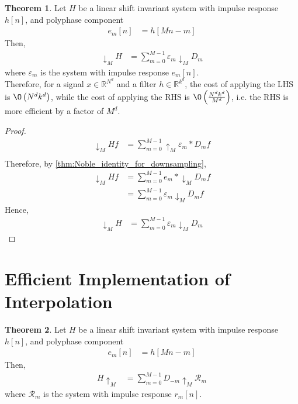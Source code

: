 \documentclass[titlepage, fleqn, a4paper, 12pt, twoside]{article}
\theoremstyle{definition}
\theoremstyle{theorem}
\newtheorem{theorem}{Theorem}
\def\downsample#1{\downarrow_{#1}}
\def\upsample#1{\uparrow_{#1}}
\begin{document}
\begin{theorem}
	Let $H$ be a linear shift invariant system with impulse response $h[n]$, and polyphase component
	\begin{align*}
		e_m[n] &= h[M n - m]
	\end{align*}
	Then,
	\begin{align*}
		\downsample{M} H &= \sum\limits_{m = 0}^{M - 1} \varepsilon_m \downsample{M} D_m
	\end{align*}
	where $\varepsilon_m$ is the system with impulse response $e_m[n]$.\\
	Therefore, for a signal $x \in \mathbb{R}^{N^d}$ and a filter $h \in \mathbb{R}^{k^d}$, the cost of applying the LHS is $\O\left( N^d k^d \right)$, while the cost of applying the RHS is $\O\left( \frac{N^d k^d}{M^d} \right)$, i.e. the RHS is more efficient by a factor of $M^d$.
\end{theorem}

\begin{proof}
	\begin{align*}
		\downsample{M} H f &= \sum\limits_{m = 0}^{M - 1} \upsample{M} \varepsilon_m \ast D_m f\\
	\end{align*}
	Therefore, by \cref{thm:Noble_identity_for_downsampling},
	\begin{align*}
		\downsample{M} H f &= \sum\limits_{m = 0}^{M - 1} e_m \ast \downsample{M} D_m f\\
		&= \sum\limits_{m = 0}^{M - 1} \varepsilon_m \downsample{M} D_m f
	\end{align*}
	Hence,
	\begin{align*}
		\downsample{M} H &= \sum\limits_{m = 0}^{M - 1} \varepsilon_m \downsample{M} D_m
	\end{align*}
\end{proof}

\section{Efficient Implementation of Interpolation}

\begin{theorem}
	Let $H$ be a linear shift invariant system with impulse response $h[n]$, and polyphase component
	\begin{align*}
		e_m[n] &= h[M n - m]
	\end{align*}
	Then,
	\begin{align*}
		H \upsample{M} &= \sum\limits_{m = 0}^{M - 1} D_{-m} \upsample{M} \mathcal{R}_m
	\end{align*}
	where $\mathcal{R}_m$ is the system with impulse response $r_m[n]$.\\
\end{theorem}
\end{document}
